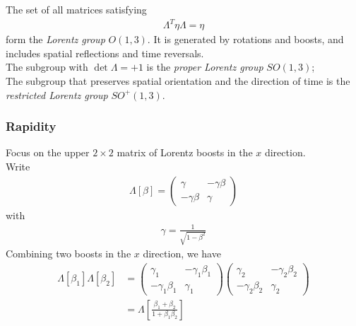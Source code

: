 \documentclass[a4paper]{article}
\begin{document}
The set of all matrices satisfying
\begin{equation*}
\begin{aligned}
\Lambda^T \eta \Lambda = \eta
\end{aligned}
\end{equation*}
form the \emph{Lorentz group} $O\left(1,3\right)$. It is generated by rotations and boosts, and includes spatial reflections and time reversals.\\
The subgroup with $\det \Lambda = +1$ is the \emph{proper Lorentz group} $SO\left(1,3\right)$;\\
The subgroup that preserves spatial orientation and the direction of time is the \emph{restricted Lorentz group} $SO^+ \left(1,3\right)$.

\subsubsection{Rapidity}
Focus on the upper $2\times 2$ matrix of Lorentz boosts in the $x$ direction.\\
Write
\begin{equation*}
\begin{aligned}
\Lambda\left[\beta\right] = \left(
\begin{matrix}
\gamma & -\gamma\beta\\
-\gamma\beta & \gamma
\end{matrix}\right)
\end{aligned}
\end{equation*}
with
\begin{equation*}
\begin{aligned}
\gamma = \frac{1}{\sqrt{1-\beta^2}}
\end{aligned}
\end{equation*}
Combining two boosts in the $x$ direction, we have
\begin{equation*}
\begin{aligned}
\Lambda\left[\beta_1\right] \Lambda \left[\beta_2\right]& = 
\left(\begin{matrix}
\gamma_1 & -\gamma_1 \beta_1\\
-\gamma_1 \beta_1 & \gamma_1
\end{matrix}\right)
\left(\begin{matrix}
\gamma_2 & -\gamma_2 \beta_2\\
-\gamma_2 \beta_2 & \gamma_2
\end{matrix}\right)\\
&=\Lambda\left[\frac{\beta_1 + \beta_2}{1+\beta_1 \beta_2}\right]
\end{aligned}
\end{equation*}
\end{document}
